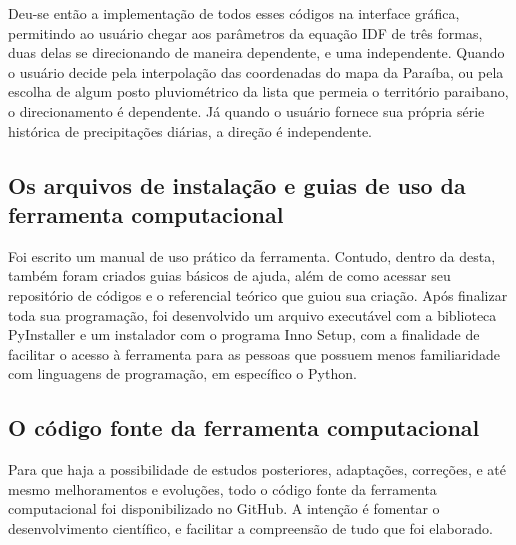 Deu-se então a implementação de todos esses códigos na interface gráfica, permitindo ao usuário chegar aos parâmetros da equação IDF de três formas, duas delas se direcionando de maneira dependente, e uma independente. Quando o usuário decide pela interpolação das coordenadas do mapa da Paraíba, ou pela escolha de algum posto pluviométrico da lista que permeia o território paraibano, o direcionamento é dependente. Já quando o usuário fornece sua própria série histórica de precipitações diárias, a direção é independente. 

\subsection{Os arquivos de instalação e guias de uso da ferramenta computacional}

Foi escrito um manual de uso prático da ferramenta. Contudo, dentro da desta, também foram criados guias básicos de ajuda, além de como acessar seu repositório de códigos e o referencial teórico que guiou sua criação. Após finalizar toda sua programação, foi desenvolvido um arquivo executável com a biblioteca PyInstaller e um instalador com o programa Inno Setup, com a finalidade de facilitar o acesso à ferramenta para as pessoas que possuem menos familiaridade com linguagens de programação, em específico o Python.

\subsection{O código fonte da ferramenta computacional}

Para que haja a possibilidade de estudos posteriores, adaptações, correções, e até mesmo melhoramentos e evoluções, todo o código fonte da ferramenta computacional foi disponibilizado no GitHub. A intenção é fomentar o desenvolvimento científico, e facilitar a compreensão de tudo que foi elaborado.


